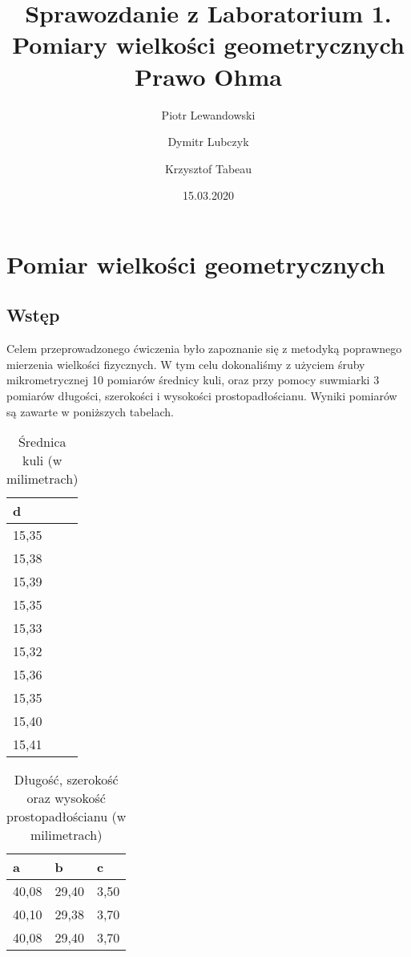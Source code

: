 \documentclass{article}
\title{Sprawozdanie z Laboratorium 1. \\ \large Pomiary wielkości geometrycznych \\ Prawo Ohma}
\author{Piotr Lewandowski \and Dymitr Lubczyk \and Krzysztof Tabeau }
\date{15.03.2020}
\begin{document}
\maketitle

\section{Pomiar wielkości geometrycznych}

\subsection{Wstęp}
Celem przeprowadzonego ćwiczenia było zapoznanie się z metodyką poprawnego mierzenia wielkości fizycznych. W tym celu dokonaliśmy z użyciem śruby mikrometrycznej 10 pomiarów średnicy kuli, oraz przy pomocy suwmiarki 3 pomiarów długości, szerokości i wysokości prostopadłościanu. Wyniki pomiarów są zawarte w poniższych tabelach.

\begin{table}[h!]
\centering
\begin{tabular}{|l|}
\hline
d     \\ \hline
15,35 \\ \hline
15,38 \\ \hline
15,39 \\ \hline
15,35 \\ \hline
15,33 \\ \hline
15,32 \\ \hline
15,36 \\ \hline
15,35 \\ \hline
15,40 \\ \hline
15,41 \\ \hline
\end{tabular}
\caption{Średnica kuli (w milimetrach)}
\end{table}


\begin{table}[h!]
\centering
\begin{tabular}{|l|l|l|}
\hline
a         & b         & c         \\ \hline
40,08     & 29,40     & 3,50      \\ \hline
40,10     & 29,38     & 3,70      \\ \hline
40,08     & 29,40     & 3,70      \\ \hline
\end{tabular}
\caption{Długość, szerokość oraz wysokość prostopadłościanu (w milimetrach)}
\end{table}
\end{document}

